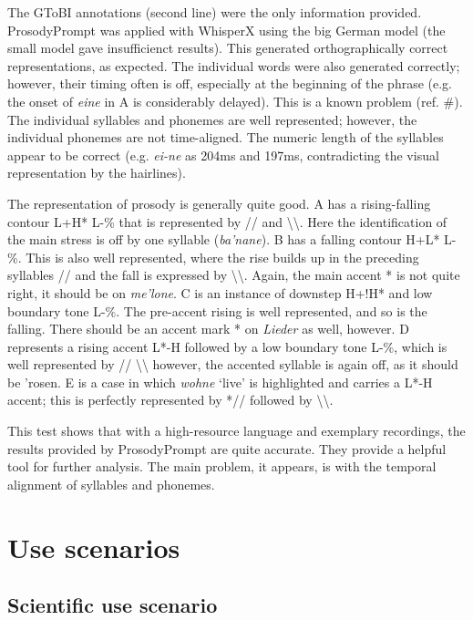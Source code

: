 The GToBI annotations (second line) were the only information provided. ProsodyPrompt was applied with WhisperX using the big German model (the small model gave insufficienct results). This generated orthographically correct representations, as expected. The individual words were also generated correctly; however, their timing often is off, especially at the beginning of the phrase (e.g. the onset of \textit{eine} in A is considerably delayed). This is a known problem (ref. #). The individual syllables and phonemes are well represented; however, the individual phonemes are not time-aligned. The numeric length of the syllables appear to be correct (e.g. \textit{ei-ne} as 204ms and 197ms, contradicting the visual representation by the hairlines). 

The representation of prosody is generally quite good. A has a rising-falling contour L+H* L-\% that is represented by // and \textbackslash \textbackslash. Here the identification of the main stress is off by one syllable (\textit{ba'nane}). B has a falling contour H+L* L-\%. This is also well represented, where the rise builds up in the preceding syllables // and the fall is expressed by \textbackslash \textbackslash. Again, the main accent * is not quite right, it should be on \textit{me'lone}. C is an instance of downstep H+!H* and low boundary tone L-\%. The pre-accent rising is well represented, and so is the falling. There should be an accent mark * on \textit{Lieder} as well, however. D represents a rising accent L*-H followed by a low boundary tone L-\%, which is well represented by // \textbackslash \textbackslash\; however, the accented syllable is again off, as it should be {'rosen}. E is a case in which \textit{wohne} ‘live’ is highlighted and carries a L*-H accent; this is perfectly represented by *// followed by \textbackslash \textbackslash. 

This test shows that with a high-resource language and exemplary recordings, the results provided by ProsodyPrompt are quite accurate. They provide a helpful tool for further analysis. The main problem, it appears, is with the temporal alignment of syllables and phonemes. 



\chapter{Use scenarios}
\label{scenarios}

\section{Scientific use scenario}

